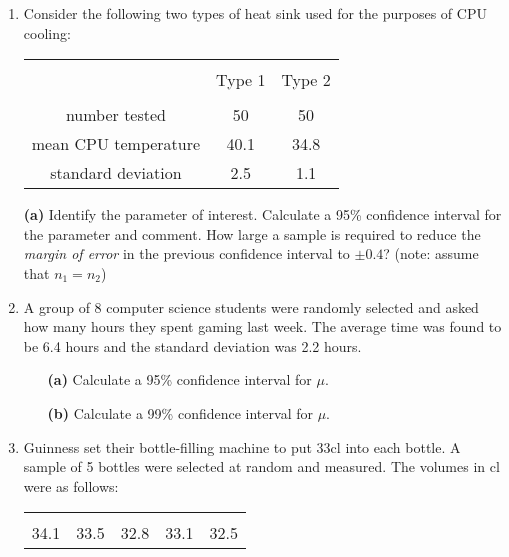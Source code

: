 \documentclass[]{report}
\begin{document}
\begin{enumerate}
	{\bf(a)} Calculate a 95\% confidence interval for the \emph{average difference} in times and hence comment on the usefulness of warming up (hint: the data is paired).
	
	
	
	\item 
	Consider the following two types of heat sink used for the purposes of CPU cooling:\\[-0.4cm]
	\begin{center}
		\begin{tabular}{|c|c|c|}
			\hline
			&&\\[-0.3cm]
			& Type 1 & Type 2 \\
			\hline
			&&\\[-0.3cm]
			number tested      & 50 & 50 \\
			mean CPU temperature   & 40.1  & 34.8 \\
			standard deviation &  2.5 & 1.1 \\[0.1cm]
			\hline
		\end{tabular}
	\end{center}
	
	{\bf(a)} Identify the parameter of interest.  Calculate a 95\% confidence interval for the parameter and comment.  How large a sample is required to reduce the \emph{margin of error} in the previous confidence interval to $\pm 0.4$? (note: assume that $n_1 = n_2$)
	
	
	\item
	A group of 8 computer science students were randomly selected and asked how many hours they spent gaming last week. The average time was found to be 6.4 hours and the standard deviation was 2.2 hours.
	\begin{itemize}
		\item[{\bf(a)}] Calculate a 95\% confidence interval for $\mu$. \item[{\bf(b)}] Calculate a 99\% confidence interval for $\mu$.
	\end{itemize}
	
	\item 
	Guinness set their bottle-filling machine to put 33cl into each bottle. A sample of 5 bottles were selected at random and measured. The volumes in cl were as follows:\\[-0.2cm]
	\begin{center}
		\begin{tabular}{|ccccc|}
			\hline
			&&&&\\[-0.3cm]
			34.1  & 33.5 & 32.8 & 33.1 & 32.5\\[0.1cm]
			\hline
		\end{tabular}
	\end{center}
	

\end{enumerate}
\end{document}
